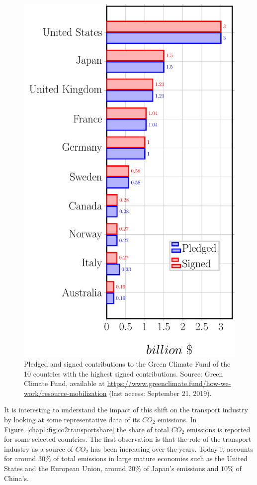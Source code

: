 \begin{description}
\begin{figure}[!h]
\includegraphics[height=0.75\textheight]{pics/green-fund-pledges.pdf}
\caption{Pledged and signed contributions to the Green Climate Fund of the 10 countries with the highest signed contributions. Source: Green Climate Fund, available at \href{https://www.greenclimate.fund/how-we-work/resource-mobilization}{https://www.greenclimate.fund/how-we-work/resource-mobilization} (last access: September 21, 2019).}\label{chap1:fig:greenfundpledges}
\end{figure}

It is interesting to understand the impact of this shift on the transport industry by looking at some representative data of its $CO_{2}$ emissions. In Figure~\ref{chap1:fig:co2transportshare} the share of total $CO_{2}$ emissions is reported for some selected countries. The first observation is that the role of the transport industry as a source of $CO_{2}$ has been increasing over the years. Today it accounts for around $30\%$ of total emissions in large mature economies such as the United States and the European Union, around $20\%$ of Japan's emissions and $10\%$ of China's.


\end{description}
